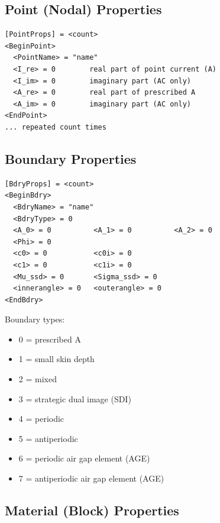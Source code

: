 \documentclass[11pt]{article}
\begin{document}
\subsection{Point (Nodal) Properties}

\begin{lstlisting}
[PointProps] = <count>
<BeginPoint>
  <PointName> = "name"
  <I_re> = 0        real part of point current (A)
  <I_im> = 0        imaginary part (AC only)
  <A_re> = 0        real part of prescribed A
  <A_im> = 0        imaginary part (AC only)
<EndPoint>
... repeated count times
\end{lstlisting}

\subsection{Boundary Properties}

\begin{lstlisting}
[BdryProps] = <count>
<BeginBdry>
  <BdryName> = "name"
  <BdryType> = 0
  <A_0> = 0          <A_1> = 0          <A_2> = 0
  <Phi> = 0
  <c0> = 0           <c0i> = 0
  <c1> = 0           <c1i> = 0
  <Mu_ssd> = 0       <Sigma_ssd> = 0
  <innerangle> = 0   <outerangle> = 0
<EndBdry>
\end{lstlisting}

Boundary types:
\begin{itemize}[nosep]
  \item 0 = prescribed A
  \item 1 = small skin depth
  \item 2 = mixed
  \item 3 = strategic dual image (SDI)
  \item 4 = periodic
  \item 5 = antiperiodic
  \item 6 = periodic air gap element (AGE)
  \item 7 = antiperiodic air gap element (AGE)
\end{itemize}

\subsection{Material (Block) Properties}
\end{document}
